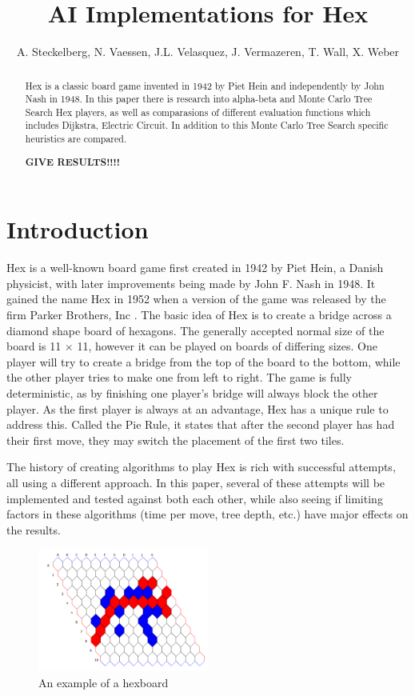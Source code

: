 \documentclass{ba-kecs}
\title{AI Implementations for Hex}
\author{A. Steckelberg, N. Vaessen, J.L. Velasquez, J. Vermazeren, T. Wall, X. Weber}
\begin{document}
\maketitle

\begin{abstract}
 Hex is a classic board game invented in 1942 by Piet Hein and independently by John Nash in 1948. In this paper there is research into alpha-beta and Monte Carlo Tree Search Hex players, as well as comparasions of different evaluation functions which includes Dijkstra, Electric Circuit. In addition to this Monte Carlo Tree Search specific heuristics are compared.   

 \textbf{GIVE RESULTS!!!!}
\end{abstract}

\section{Introduction}
Hex is a well-known board game first created in 1942 by Piet Hein, a Danish physicist, with later improvements being made by John F. Nash in 1948. It gained the name Hex in 1952 when a version of the game was released by the firm Parker Brothers, Inc \cite{gardener1959hex}. The basic idea of Hex is to create a bridge across a diamond shape board of hexagons. The generally accepted normal size of the board is 11 $\times$ 11, however it can be played on boards of differing sizes. One player will try to create a bridge from the top of the board to the bottom, while the other player tries to make one from left to right. The game is fully deterministic, as by finishing one player’s bridge will always block the other player. As the first player is always at an advantage, Hex has a unique rule to address this. Called the Pie Rule, it states that after the second player has had their first move, they may switch the placement of the first two tiles.

The history of creating algorithms to play Hex is rich with successful attempts, all using a different approach. In this paper, several of these attempts will be implemented and tested against both each other, while also seeing if limiting factors in these algorithms (time per move, tree depth, etc.) have major effects on the results.

\begin{figure}
	\centering
	\includegraphics[width=0.5\textwidth]{figure_hexboard.png}
	\caption{An example of a hexboard}
	\label{fig:hexboard}
\end{figure}
\end{document}
